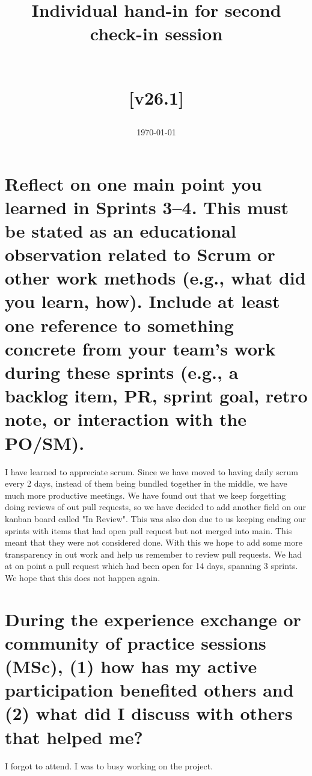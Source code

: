 \documentclass{article}
\title{Individual hand-in for second check-in session %

	\\[10pt] %
	\normalsize{[v26.1]}}
\date{\today}
\begin{document}
\maketitle

\vfill

\newpage

\section{Reflect on one main point you learned in Sprints 3–4. This must be stated as an educational observation related to Scrum or other work methods (e.g., what did you learn, how). Include at least one reference to something concrete from your team’s work during these sprints (e.g., a backlog item, PR, sprint goal, retro note, or interaction with the PO/SM).}
\label{sec:actual}
I have learned to appreciate scrum. Since we have moved to having daily scrum every 2 days, instead of them being bundled together in the middle, we have much more productive meetings.
We have found out that we keep forgetting doing reviews of out pull requests, so we have decided to add another field on our kanban board called "In Review". This was also don due to us keeping ending our sprints with items that had open pull request but not merged into main. This meant that they were not considered done. With this we hope to add some more transparency in out work and help us remember to review pull requests. We had at on point a pull request which had been open for 14 days, spanning 3 sprints. We hope that this does not happen again.



\section{During the experience exchange or community of practice sessions (MSc), (1) how has my active participation benefited others and (2) what did I discuss with others that helped me?}
\label{sec:exchange}
I forgot to attend. I was to busy working on the project.\\
\end{document}
